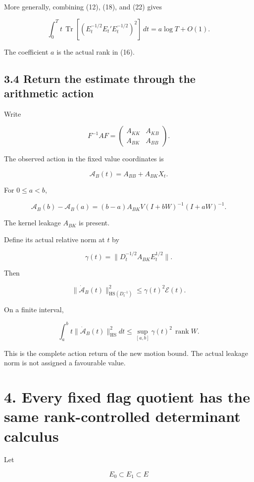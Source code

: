 More generally, combining (12), (18), and (22) gives

\[
\int_0^Tt\,
\operatorname{Tr}
[(E_t^{-1/2}E_t'E_t^{-1/2})^2]\,dt
=
a\log T+O(1).
\tag{27}
\]

The coefficient \(a\) is the actual rank in (16).

\subsection{3.4 Return the estimate through the arithmetic action}\label{return-the-estimate-through-the-arithmetic-action}

Write

\[
F^{-1}AF=
\begin{pmatrix}
A_{KK}&A_{KB}\\
A_{BK}&A_{BB}
\end{pmatrix}.
\]

The observed action in the fixed value coordinates is

\[
\mathcal A_B(t)=A_{BB}+A_{BK}X_t.
\]

For \(0\le a<b\),

\[
\boxed{
\mathcal A_B(b)-\mathcal A_B(a)
=
(b-a)A_{BK}V(I+bW)^{-1}(I+aW)^{-1}.
}
\tag{28}
\]

The kernel leakage \(A_{BK}\) is present.

Define its actual relative norm at \(t\) by

\[
\gamma(t)=
\|D_t^{-1/2}A_{BK}E_t^{1/2}\|.
\]

Then

\[
\boxed{
\|\dot{\mathcal A}_B(t)\|_{\mathrm{HS}(D_t^{-1})}^{2}
\le\gamma(t)^2\mathcal E(t).
}
\tag{29}
\]

On a finite interval,

\[
\int_a^b t\|\dot{\mathcal A}_B(t)\|_{\mathrm{HS}}^2dt
\le
\sup_{[a,b]}\gamma(t)^2\,\operatorname{rank}W.
\]

This is the complete action return of the new motion bound. The actual leakage norm is not assigned a favourable value.

\section{4. Every fixed flag quotient has the same rank-controlled determinant calculus}\label{every-fixed-flag-quotient-has-the-same-rank-controlled-determinant-calculus}

Let

\[
E_0\subset E_1\subset E
\]

